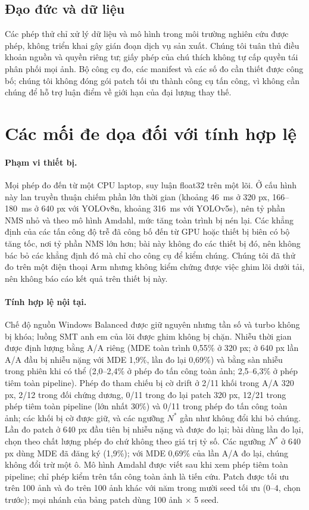 \documentclass[a4paper,fleqn]{cas-dc}
\begin{document}
\subsection{Đạo đức và dữ liệu}
Các phép thử chỉ xử lý dữ liệu và mô hình trong môi trường nghiên cứu được phép, không triển khai gây gián đoạn dịch vụ sản xuất. Chúng tôi tuân thủ điều khoản nguồn và quyền riêng tư; giấy phép của chú thích không tự cấp quyền tái phân phối mọi ảnh. Bộ công cụ đo, các manifest và các số đo cần thiết được công bố; chúng tôi không đóng gói patch tối ưu thành công cụ tấn công, vì không cần chúng để hỗ trợ luận điểm về giới hạn của đại lượng thay thế.

\section{Các mối đe dọa đối với tính hợp lệ}
\label{sec:threats}
\paragraph{Phạm vi thiết bị.}
Mọi phép đo đến từ một CPU laptop, suy luận float32 trên một lõi. Ở cấu hình này lan truyền thuận chiếm phần lớn thời gian (khoảng 46~ms ở 320 px, 166--180~ms ở 640 px với YOLOv8n, khoảng 316~ms với YOLOv5s), nên tỷ phần NMS nhỏ và theo mô hình Amdahl, mức tăng toàn trình bị nén lại. Các khẳng định của các tấn công độ trễ đã công bố đến từ GPU hoặc thiết bị biên có bộ tăng tốc, nơi tỷ phần NMS lớn hơn; bài này không đo các thiết bị đó, nên không bác bỏ các khẳng định đó mà chỉ cho công cụ để kiểm chúng. Chúng tôi đã thử đo trên một điện thoại Arm nhưng không kiểm chứng được việc ghim lõi dưới tải, nên không báo cáo kết quả trên thiết bị này.
\paragraph{Tính hợp lệ nội tại.}
Chế độ nguồn Windows Balanced được giữ nguyên nhưng tần số và turbo không bị khóa; luồng SMT anh em của lõi được ghim không bị chặn. Nhiễu thời gian được định lượng bằng A/A riêng (MDE toàn trình 0,55\% ở 320 px; ở 640 px lần A/A đầu bị nhiễu nặng với MDE 1,9\%, lần đo lại 0,69\%) và bằng sàn nhiễu trong phiên khi có thể (2,0--2,4\% ở phép đo tấn công toàn ảnh; 2,5--6,3\% ở phép tiêm toàn pipeline). Phép đo tham chiếu bị cờ drift ở 2/11 khối trong A/A 320 px, 2/12 trong đối chứng dương, 0/11 trong đo lại patch 320 px, 12/21 trong phép tiêm toàn pipeline (lớn nhất 30\%) và 0/11 trong phép đo tấn công toàn ảnh; các khối bị cờ được giữ, và các ngưỡng $N^{*}$ gần như không đổi khi bỏ chúng. Lần đo patch ở 640 px đầu tiên bị nhiễu nặng và được đo lại; bài dùng lần đo lại, chọn theo chất lượng phép đo chứ không theo giá trị tỷ số. Các ngưỡng $N^{*}$ ở 640 px dùng MDE đã đăng ký (1,9\%); với MDE 0,69\% của lần A/A đo lại, chúng không đổi trừ một ô. Mô hình Amdahl được viết sau khi xem phép tiêm toàn pipeline; chỉ phép kiểm trên tấn công toàn ảnh là tiến cứu. Patch được tối ưu trên 100 ảnh và đo trên 100 ảnh khác với năm trong mười seed tối ưu (0--4, chọn trước); mọi nhánh của bảng patch dùng 100 ảnh $\times$ 5 seed.
\end{document}
